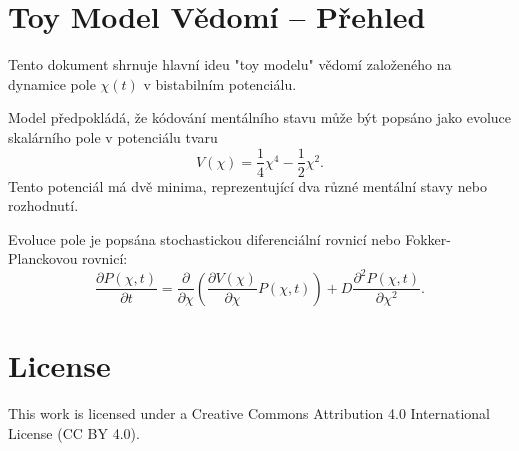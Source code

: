 \documentclass{article}
\begin{document}
\section*{Toy Model Vědomí – Přehled}

Tento dokument shrnuje hlavní ideu "toy modelu" vědomí založeného na dynamice pole $\chi(t)$ v bistabilním potenciálu.

Model předpokládá, že kódování mentálního stavu může být popsáno jako evoluce skalárního pole v potenciálu tvaru
\[
V(\chi) = \frac{1}{4} \chi^4 - \frac{1}{2} \chi^2.
\]
Tento potenciál má dvě minima, reprezentující dva různé mentální stavy nebo rozhodnutí.

Evoluce pole je popsána stochastickou diferenciální rovnicí nebo Fokker-Planckovou rovnicí:
\[
\frac{\partial P(\chi, t)}{\partial t} = \frac{\partial}{\partial \chi} \left( \frac{\partial V(\chi)}{\partial \chi} P(\chi, t) \right) + D \frac{\partial^2 P(\chi, t)}{\partial \chi^2}.
\]


\section*{License}
This work is licensed under a Creative Commons Attribution 4.0 International License (CC BY 4.0).
\end{document}
